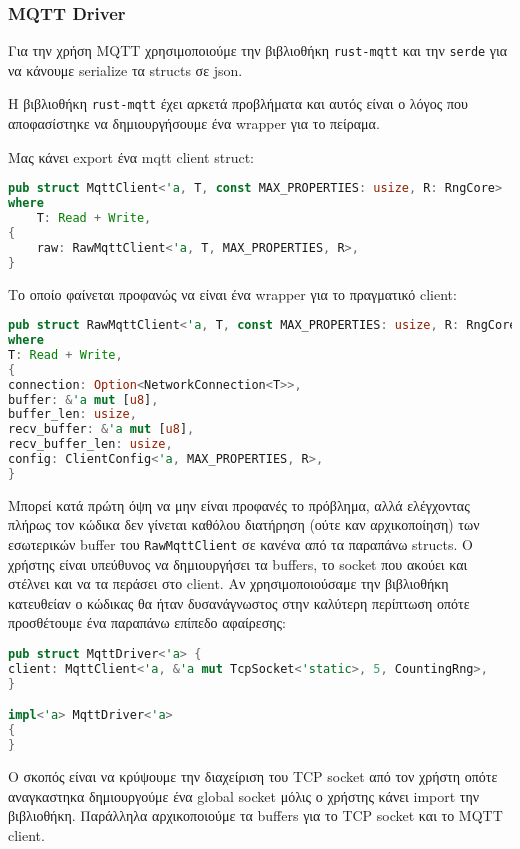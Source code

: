 \subsubsection{MQTT Driver}

Για την χρήση MQTT χρησιμοποιούμε την βιβλιοθήκη \verb|rust-mqtt|
και την \verb|serde| για να κάνουμε serialize τα structs σε json.

Η βιβλιοθήκη \verb|rust-mqtt| έχει αρκετά προβλήματα και αυτός είναι
ο λόγος που αποφασίστηκε να δημιουργήσουμε ένα wrapper για το πείραμα.

Μας κάνει export ένα mqtt client struct:

\begin{lstlisting}[language=Rust]
pub struct MqttClient<'a, T, const MAX_PROPERTIES: usize, R: RngCore>
where
    T: Read + Write,
{
    raw: RawMqttClient<'a, T, MAX_PROPERTIES, R>,
}
\end{lstlisting}

Το οποίο φαίνεται προφανώς να είναι ένα wrapper για το πραγματικό client:

\begin{lstlisting}[language=Rust]
pub struct RawMqttClient<'a, T, const MAX_PROPERTIES: usize, R: RngCore>
where
T: Read + Write,
{
connection: Option<NetworkConnection<T>>,
buffer: &'a mut [u8],
buffer_len: usize,
recv_buffer: &'a mut [u8],
recv_buffer_len: usize,
config: ClientConfig<'a, MAX_PROPERTIES, R>,
}
\end{lstlisting}

Μπορεί κατά πρώτη όψη να μην είναι προφανές το πρόβλημα, αλλά
ελέγχοντας πλήρως τον κώδικα δεν γίνεται καθόλου διατήρηση (ούτε καν
αρχικοποίηση) των εσωτερικών buffer του \verb|RawMqttClient| σε κανένα
από τα παραπάνω structs. Ο χρήστης είναι υπεύθυνος να δημιουργήσει τα buffers,
το socket που ακούει και στέλνει και να τα περάσει στο client. Αν χρησιμοποιούσαμε
την βιβλιοθήκη κατευθείαν ο κώδικας θα ήταν δυσανάγνωστος στην καλύτερη περίπτωση οπότε
προσθέτουμε ένα παραπάνω επίπεδο αφαίρεσης:

\begin{lstlisting}[language=Rust]
pub struct MqttDriver<'a> {
client: MqttClient<'a, &'a mut TcpSocket<'static>, 5, CountingRng>,
}

impl<'a> MqttDriver<'a>
{
}
\end{lstlisting}

Ο σκοπός είναι να κρύψουμε την διαχείριση του TCP socket από
τον χρήστη οπότε αναγκαστηκα δημιουργούμε ένα global socket
μόλις ο χρήστης κάνει import την βιβλιοθήκη. Παράλληλα
αρχικοποιούμε τα buffers για το TCP socket και το MQTT client.

